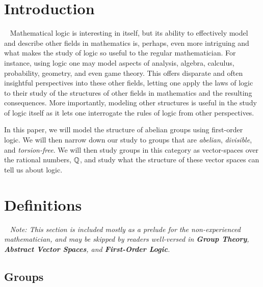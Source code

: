 \section{Introduction}~\label{sec:prelims}
Mathematical logic is interesting in itself, but
its ability to effectively model and describe other
fields in mathematics is, perhaps, even more intriguing
and what makes the study of logic so useful to the regular
mathematician.
For instance, using logic one may model aspects of
analysis, algebra, calculus, probability, geometry,
and even game theory.
This offers disparate and often insightful perspectives into these other fields,
letting one apply the laws of logic to their study of the structures
of other fields in mathematics and the resulting consequences.
More importantly, modeling other structures is useful in the study of logic
itself as it lets one interrogate the rules of logic from other perspectives.

In this paper, we will model the structure of abelian groups using
first-order logic. We will then narrow down our study to groups that
are \emph{abelian}, \emph{divisible}, and \emph{torsion-free}.
We will then study groups in this category as vector-spaces
over the rational numbers, $\mathbb{Q}$, and study what the structure of these
vector spaces can tell us about logic.

\section{Definitions}~\label{sec:definitions}
\emph{
  Note: This section is included mostly as a prelude for the
  non-experienced mathematician, and may be skipped by readers
  well-versed in
  \textbf{Group Theory},
  \textbf{Abstract Vector Spaces},
  and \textbf{First-Order Logic}.
}

\subsection{Groups}~\label{sec:def-groups}

